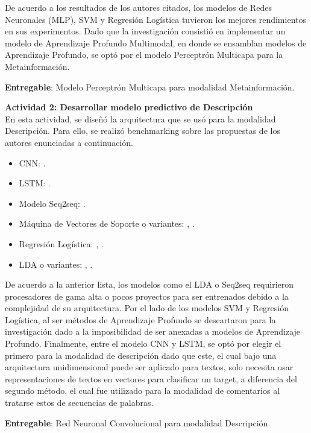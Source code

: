 De acuerdo a los resultados de los autores citados, los modelos de Redes Neuronales (MLP), SVM y Regresión Logística tuvieron los mejores rendimientos en sus experimentos. Dado que la investigación consistió en implementar un modelo de Aprendizaje Profundo Multimodal, en donde se ensamblan modelos de Aprendizaje Profundo, se optó por el modelo Perceptrón Multicapa para la Metainformación.

\textbf{Entregable}: Modelo Perceptrón Multicapa para modalidad Metainformación.

\textbf{Actividad 2: Desarrollar modelo predictivo de Descripción}
\\
En esta actividad, se diseñó la arquitectura que se usó para la modalidad Descripción. Para ello, se realizó benchmarking sobre las propuestas de los autores enunciadas a continuación.

\begin{itemize}
	\item CNN: \cite{pr_cheng2019deeplearning}.
	\item LSTM: \cite{pr_jin2019dayssuccess}.
	\item Modelo Seq2seq: \cite{pr_lee2018contentDL}.
	\item Máquina de Vectores de Soporte o variantes: \cite{pr_sawhney2016usingLT}, \cite{pr_chen2019keywords_crowdfunding}.
	\item Regresión Logística: \cite{pr_mitra2014phrases}, \cite{pr_zhou2015projectdesc}.
	\item LDA o variantes: \cite{pr_yuan2016textanalytics}, \cite{pr_sawhney2016usingLT}.
\end{itemize}

De acuerdo a la anterior lista, los modelos como el LDA o Seq2seq requirieron procesadores de gama alta o pocos proyectos para ser entrenados debido a la complejidad de su arquitectura. Por el lado de los modelos SVM y Regresión Logística, al ser métodos de Aprendizaje Profundo se descartaron para la investigación dado a la imposibilidad de ser anexadas a modelos de Aprendizaje Profundo. Finalmente, entre el modelo CNN y LSTM, se optó por elegir el primero para la modalidad de descripción dado que este, el cual bajo una arquitectura unidimensional puede ser aplicado para textos, solo necesita usar representaciones de textos en vectores para clasificar un target, a diferencia del segundo método, el cual fue utilizado para la modalidad de comentarios al tratarse estos de secuencias de palabras.

\textbf{Entregable}: Red Neuronal Convolucional para modalidad Descripción.

